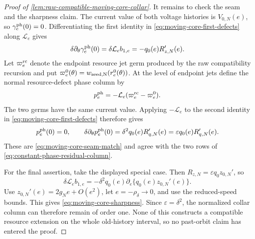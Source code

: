\begin{proof}[Proof of \cref{lem:raw-compatible-moving-core-collar}]
It remains to check the seam and the sharpness claim.  The current value of
both voltage histories is \(V_{0,N}(e)\), so
\(\gamma_e^{\rm ph}(0)=0\).  Differentiating the first identity in
\cref{eq:moving-core-first-defects} along \(\mathcal L_e\) gives
\begin{equation*}
 \delta\partial_\theta\gamma_e^{\rm ph}(0)
 =\delta\mathcal L_eb_{1,e}=-q_0(e)R_{z,N}'(e).
\end{equation*}
Let \(\varpi_e^{\rm rc}\) denote the endpoint resource jet germ produced by
the raw compatibility recursion and put
\(\varpi_e^0(\theta)=w_{\rm seed,N}(r_e^0(\theta))\).  At the level of
endpoint jets define the normal resource-defect phase column by
\begin{equation*}
 p_e^{\rm ph}=-\mathcal L_e(\varpi_e^{\rm rc}-\varpi_e^0).
\end{equation*}
The two germs have the same current value.  Applying
\(-\mathcal L_e\) to the second identity in
\cref{eq:moving-core-first-defects} therefore gives
\begin{equation*}
 p_e^{\rm ph}(0)=0,
 \qquad
 \delta\partial_\theta p_e^{\rm ph}(0)
 =\delta^2q_0(e)R_{q,N}'(e)
 =\varepsilon q_0(e)R_{q,N}'(e).
\end{equation*}
These are \cref{eq:moving-core-seam-match} and agree with the two rows of
\cref{eq:constant-phase-residual-column}.

For the final assertion, take the displayed special case.  Then
\(R_{z,N}=\varepsilon q_0z_{0,N}'\), so
\begin{equation*}
 \delta\mathcal L_eb_{1,e}
 =-\delta^2q_0(e)\partial_e\{q_0(e)z_{0,N}'(e)\}.
\end{equation*}
Use \(z_{0,N}'(e)=2g_Ne+O(e^2)\), let
\(e=-\rho_\delta\to0\), and use the reduced-speed bounds.  This gives
\cref{eq:moving-core-sharpness}.  Since \(\varepsilon=\delta^2\), the
normalized collar column can therefore remain of order one.  None of this
constructs a compatible resource extension on the whole old-history
interval, so no past-orbit claim has entered the proof.
\end{proof}

